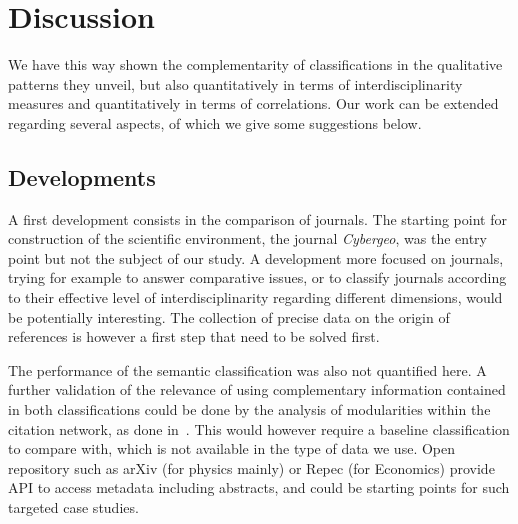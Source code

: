 \section*{Discussion}
\label{sec:discussion}

We have this way shown the complementarity of classifications in the qualitative patterns they unveil, but also quantitatively in terms of interdisciplinarity measures and quantitatively in terms of correlations. Our work can be extended regarding several aspects, of which we give some suggestions below.



\subsection*{Developments}


A first development consists in the comparison of journals. The starting point for construction of the scientific environment, the journal \textit{Cybergeo}, was the entry point but not the subject of our study. A development more focused on journals, trying for example to answer comparative issues, or to classify journals according to their effective level of interdisciplinarity regarding different dimensions, would be potentially interesting. The collection of precise data on the origin of references is however a first step that need to be solved first.



The performance of the semantic classification was also not quantified here. A further validation of the relevance of using complementary information contained in both classifications could be done by the analysis of modularities within the citation network, as done in~\cite{bergeaud2017classifying}. This would however require a baseline classification to compare with, which is not available in the type of data we use. Open repository such as arXiv (for physics mainly) or Repec (for Economics) provide API to access metadata including abstracts, and could be starting points for such targeted case studies.



